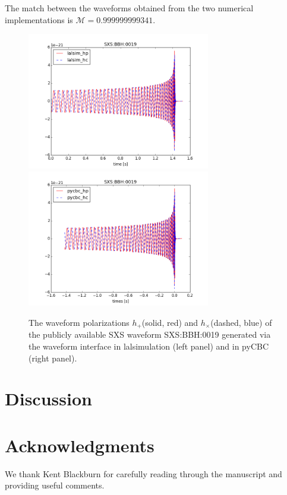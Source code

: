 \documentclass[aps,prd,amssymb,amsmath,amsfonts,superscriptaddress,
floatfix ,preprintnumbers,altaffilletter]{revtex4}
\begin{document}
The match between the waveforms obtained from the two numerical implementations is $\mathcal{M}=0.999999999341$.
\begin{figure}
\begin{center}
\includegraphics[width=80mm]{lalsim_TD_0019.png}
\includegraphics[width=80mm]{pycbc_TD_0019.png}
\caption{The waveform polarizations $h_+$(solid, red) and $h_\times$(dashed, blue) of the publicly available SXS waveform SXS:BBH:0019 
generated via the waveform interface in lalsimulation (left panel) and in pyCBC (right panel).}
\label{fig:waveforms}
\end{center}
\end{figure}


\section{Discussion}
\label{sec:discussion}

\section*{Acknowledgments}
We thank Kent Blackburn for carefully reading through the manuscript and providing useful comments.

\appendix
\end{document}
